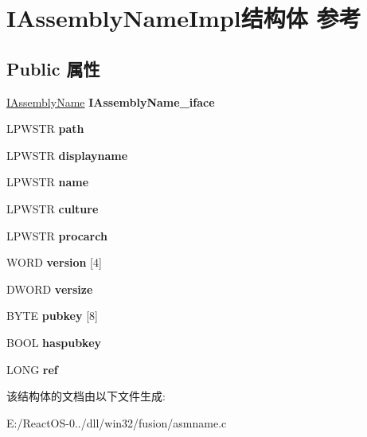 \hypertarget{struct_i_assembly_name_impl}{}\section{I\+Assembly\+Name\+Impl结构体 参考}
\label{struct_i_assembly_name_impl}
\subsection*{Public 属性}
\begin{DoxyCompactItemize}
\item 
\mbox{\label{struct_i_assembly_name_impl_a7f9990270cde126fa5d4dfe22f9689a3}} 
\hyperlink{interface_i_assembly_name}{I\+Assembly\+Name} {\bfseries I\+Assembly\+Name\+\_\+iface}
\item 
\mbox{\label{struct_i_assembly_name_impl_a88a8c1afc676936525b4bbf5d6980cd5}} 
L\+P\+W\+S\+TR {\bfseries path}
\item 
\mbox{\label{struct_i_assembly_name_impl_a6fce82b0d26ea3e31352b746f4055820}} 
L\+P\+W\+S\+TR {\bfseries displayname}
\item 
\mbox{\label{struct_i_assembly_name_impl_a777b9895a39fc1f434a2656c3560baef}} 
L\+P\+W\+S\+TR {\bfseries name}
\item 
\mbox{\label{struct_i_assembly_name_impl_a4af303a995f9ce40a8c48b02f9858ac9}} 
L\+P\+W\+S\+TR {\bfseries culture}
\item 
\mbox{\label{struct_i_assembly_name_impl_af27e5e4d91c284262f6bfdf3d724fd0e}} 
L\+P\+W\+S\+TR {\bfseries procarch}
\item 
\mbox{\label{struct_i_assembly_name_impl_ade2fba6bced3033c5ca064b3a1a5d8ca}} 
W\+O\+RD {\bfseries version} \mbox{[}4\mbox{]}
\item 
\mbox{\label{struct_i_assembly_name_impl_afa13bfeb4af914b0f17e61fb378e4488}} 
D\+W\+O\+RD {\bfseries versize}
\item 
\mbox{\label{struct_i_assembly_name_impl_a11340fcc58967ba1801d1f6969e0a598}} 
B\+Y\+TE {\bfseries pubkey} \mbox{[}8\mbox{]}
\item 
\mbox{\label{struct_i_assembly_name_impl_a5aa77c7558057b7356c5eb2d22064fd0}} 
B\+O\+OL {\bfseries haspubkey}
\item 
\mbox{\label{struct_i_assembly_name_impl_a2fdf9ae04ba2bd197d2e347ce6b23fd9}} 
L\+O\+NG {\bfseries ref}
\end{DoxyCompactItemize}


该结构体的文档由以下文件生成\+:\begin{DoxyCompactItemize}
\item 
E\+:/\+React\+O\+S-\/0../dll/win32/fusion/asmname.\+c\end{DoxyCompactItemize}
